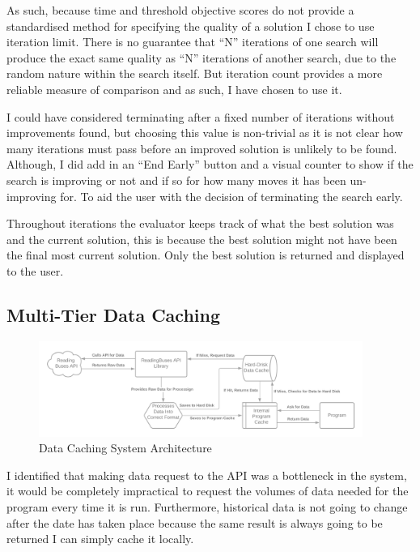 \documentclass{article}
\begin{document}
\par 
As such, because time and threshold objective scores do not provide a standardised method for specifying the quality of a solution I chose to use iteration limit. There is no guarantee that ``N'' iterations of one search will produce the exact same quality as ``N'' iterations of another search, due to the random nature within the search itself. But iteration count provides a more reliable measure of comparison and as such, I have chosen to use it.

\par 
I could have considered terminating after a fixed number of iterations without improvements found, but choosing this value is non-trivial as it is not clear how many iterations must pass before an improved solution is unlikely to be found. Although, I did add in an ``End Early'' button and a visual counter to show if the search is improving or not and if so for how many moves it has been un-improving for. To aid the user with the decision of terminating the search early.

\par 
Throughout iterations the evaluator keeps track of what the best solution was and the current solution, this is because the best solution might not have been the final most current solution. Only the best solution is returned and displayed to the user.


\subsection{Multi-Tier Data Caching}
\label{caching}


\begin{figure}[H]
	\centering
	\includegraphics[width=400px]{images/cacheV2.png}
	\caption{Data Caching System Architecture}
	\label{fig:cachingsystem}
\end{figure}


I identified that making data request to the API was a bottleneck in the system, it would be completely impractical to request the volumes of data needed for the program every time it is run. Furthermore, historical data is not going to change after the date has taken place because the same result is always going to be returned I can simply cache it locally. 
\end{document}
